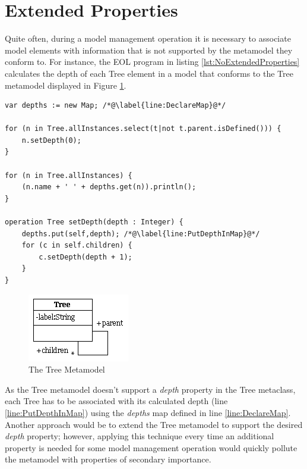 \section{Extended Properties}
\label{sec:ExtendedProperties}

Quite often, during a model management operation it is necessary to associate model elements with information that is not supported by the metamodel they conform to. For instance, the EOL program in listing \ref{lst:NoExtendedProperties} calculates the depth of each Tree element in a model that conforms to the Tree metamodel displayed in Figure \ref{fig:Tree1}.


\begin{lstlisting}[basicstyle=\ttfamily\footnotesize, flexiblecolumns=true, numbers=none, nolol=true, caption=Calculating and printing the depth of each Tree, label=lst:NoExtendedProperties, numbers=left, language=EOL, tabsize=2]
var depths := new Map; /*@\label{line:DeclareMap}@*/

for (n in Tree.allInstances.select(t|not t.parent.isDefined())) {
	n.setDepth(0);
}

for (n in Tree.allInstances) {
	(n.name + ' ' + depths.get(n)).println();
}

operation Tree setDepth(depth : Integer) {
	depths.put(self,depth); /*@\label{line:PutDepthInMap}@*/
	for (c in self.children) {
		c.setDepth(depth + 1);
	}
}
\end{lstlisting}

\begin{figure}[t!]
	\centering
		\includegraphics{images/metamodels/Tree.png}
	\caption{The Tree Metamodel}
	\label{fig:Tree1}
\end{figure}

As the Tree metamodel doesn't support a \emph{depth} property in the Tree metaclass, each Tree has to be associated with its calculated depth (line \ref{line:PutDepthInMap}) using the \emph{depths} map defined in line \ref{line:DeclareMap}. Another approach would be to extend the Tree metamodel to support the desired \emph{depth} property; however, applying this technique every time an additional property is needed for some model management operation would quickly pollute the metamodel with properties of secondary importance.

